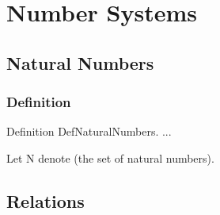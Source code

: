 \section{Number Systems}

\subsection{Natural Numbers}

\subsubsection{Definition}

\begin{true}

\end{true}
\begin{forthel}
Definition DefNaturalNumbers.
    ...

Let N denote (the set of natural numbers).
\end{forthel}

\subsection{Relations}

